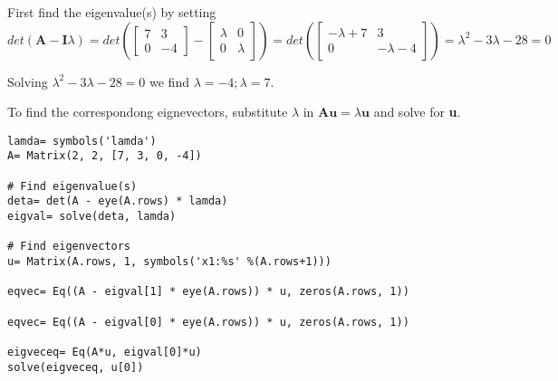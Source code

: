 First find the eigenvalue(s) by setting
$$
det(\mathbf{A - I}\lambda) =
det(\left[\begin{matrix}7 & 3\\0 & -4\end{matrix}\right] - \left[\begin{matrix}\lambda & 0\\0 & \lambda\end{matrix}\right]) =
det(\left[\begin{matrix}- \lambda + 7 & 3\\0 & - \lambda - 4\end{matrix}\right]) =
\lambda^{2} - 3 \lambda - 28 = 0
$$

Solving $\lambda^{2} - 3 \lambda - 28 = 0$ we find $\lambda = -4; \lambda= 7$.

To find the correspondong eignevectors, substitute $\lambda$ in $\mathbf{Au} = \lambda\mathbf{u}$
and solve for \textbf{u}.

\begin{verbatim}
lamda= symbols('lamda')
A= Matrix(2, 2, [7, 3, 0, -4])

# Find eigenvalue(s)
deta= det(A - eye(A.rows) * lamda)
eigval= solve(deta, lamda)

# Find eigenvectors
u= Matrix(A.rows, 1, symbols('x1:%s' %(A.rows+1)))

eqvec= Eq((A - eigval[1] * eye(A.rows)) * u, zeros(A.rows, 1))

eqvec= Eq((A - eigval[0] * eye(A.rows)) * u, zeros(A.rows, 1))

eigveceq= Eq(A*u, eigval[0]*u)
solve(eigveceq, u[0])
\end{verbatim}